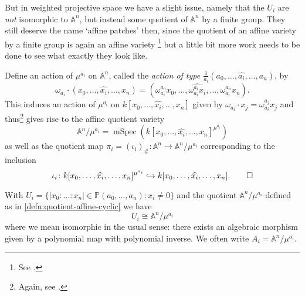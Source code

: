 \documentclass[10pt,notitlepage]{article}
\numberwithin{equation}{subsection}
\DeclareMathOperator{\mspec}{mSpec}
\newcommand{\aff}{\mathbb{A}}
\newcommand{\pee}{\mathbb{P}}
\newcommand{\remove}[1]{\widehat{#1}}
\begin{document}
    But in weighted projective space we have a slight issue, namely that the $U_i$ are \emph{not} isomorphic to $\aff^n$, but instead some quotient of $\aff^n$ by a finite group.
    They still deserve the name `affine patches' then, since the quotient of an affine variety by a finite group is again an affine variety%
    \footnote{%
        See \cite[Definition~3.6,~Theorem~3.8]{Hoskins:2012uq}.
    } but a little bit more work needs to be done to see what exactly they look like.

    \begin{definition}\label{defn:quotient-affine-cyclic}
        Define an action of $\mu^{a_i}$ on $\aff^n$, called the \emph{action of type $\frac{1}{a_i}(a_0,\ldots,\remove{a_i},\ldots,a_n)$}, by
        \begin{equation}
            \omega_{a_i}\cdot(x_0,\ldots,\remove{x_i},\ldots,x_n) = (\omega_{a_i}^{a_0}x_0,\ldots,\remove{\omega_{a_i}^{a_i}x_i},\ldots,\omega_{a_i}^{a_n}x_n).
        \end{equation}
        This induces an action of $\mu^{a_i}$ on $k[x_0,\ldots,\remove{x_i},\ldots,x_n]$ given by $\omega_{a_i}\cdot x_j = \omega_{a_i}^{a_j}x_j$ and thus\footnote{%
            Again, see \cite[Definition~3.6,~Theorem~3.8]{Hoskins:2012uq}.
        } gives rise to the affine quotient variety
        \[
            \aff^n/\mu^{a_i} = \mspec \left(k[x_0,\ldots,\remove{x_i},\ldots,x_n]^{\mu^{a_i}}\right)
        \]
        as well as the quotient map $\pi_i = (\iota_i)_{\#}\colon\aff^n\to\aff^n/\mu^{a_i}$ corresponding to the inclusion
        \[
            \iota_i\colon k[x_0,\ldots,\remove{x_i},\ldots,x_n]^{\mu^{a_i}}\hookrightarrow k[x_0,\ldots,\remove{x_i},\ldots,x_n].\qedhere
        \]
    \end{definition}

    \begin{lemma}\label{lem:affine-patches}
        With $U_i=\{|x_0:\ldots:x_n|\in\pee(a_0,\ldots,a_n) : x_i\neq0\}$ and the quotient $\aff^n/\mu^{a_i}$ defined as in \cref{defn:quotient-affine-cyclic} we have
        \[
            U_i \cong \aff^n/\mu^{a_i}
        \]
        where we mean isomorphic in the usual sense: there exists an algebraic morphism given by a polynomial map with polynomial inverse.
        We often write $A_i=\aff^n/\mu^{a_i}$.
    \end{lemma}
\end{document}
